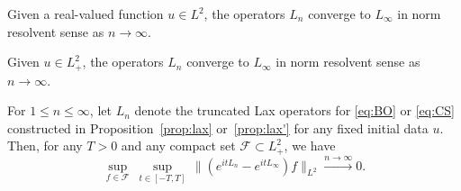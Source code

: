 \documentclass[10pt,a4paper]{amsart}
\newcommand{\mc}[1]{\mathcal{#1}}
\begin{document}
\begin{lem}
\label{lem:resolv 2}
Given a real-valued function $u\in L^2$, the operators $L_n$ converge to $L_\infty$ in norm resolvent sense as $n\to\infty$.
\end{lem}

\begin{lem}
\label{lem:resolv 2'}
Given $u\in L^2_+$, the operators $L_n$ converge to $L_\infty$ in norm resolvent sense as $n\to\infty$.
\end{lem}

\begin{prop}\label{lem:resolv}
For $1\leq n\leq \infty$, let $L_n$ denote the truncated Lax operators for \eqref{eq:BO} or \eqref{eq:CS} constructed in Proposition~\ref{prop:lax} or~\ref{prop:lax'} for any fixed initial data $u$.  Then, for any $T>0$ and any compact set $\mc{F}\subset L^2_{+}$, we have
\begin{equation}
\sup_{f\in \mathcal{F}}\ \sup_{t\in[-T,T]}\, \| (e^{itL_n} - e^{itL_\infty})f \|_{L^2} \xrightarrow{n \to \infty} 0.
\label{resolv}
\end{equation}
\end{prop}
\end{document}
